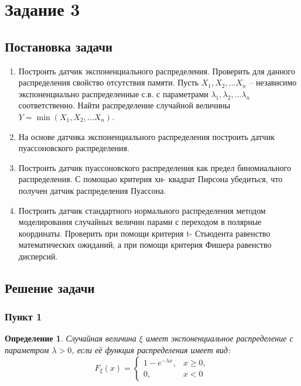 \documentclass[oneside, final, 12pt]{article}
\newtheorem{definition}{Определение}
\begin{document}
\newpage
\section{Задание 3}

\subsection{Постановка задачи}
    \begin{enumerate} 
        \item Построить датчик экспоненциального распределения. 
			Проверить для данного распределения свойство отсутствия памяти. Пусть 
        		$X_1, X_2, \ldots X_n$ -- независимо экспоненциально распределенные с.в. 
			с параметрами $\lambda_1, \lambda_2, \ldots \lambda_n$ соответственно.
			Найти распределение случайной величины $Y = \min{(X_1, X_2, \ldots X_n)}$.  
        \item На основе датчика экспоненциального распределения построить датчик
			пуассоновского распределения. 
        \item Построить датчик пуассоновского распределения как предел биномиального распределения.
			С помощью критерия хи- квадрат Пирсона убедиться, что получен датчик распределения Пуассона. 
        \item Построить датчик стандартного нормального распределения методом моделирования случайных
			величин парами с переходом в полярные координаты. Проверить при помощи
			критерия t- Стьюдента равенство математических ожиданий,
			а при помощи критерия Фишера равенство дисперсий. 
    \end{enumerate}
\subsection{Решение задачи}
\subsubsection{Пункт 1}

	\begin{definition}
		Случайная величина $\xi$ имеет экспоненциальное распределение
		с параметром $\lambda > 0$, если её функция распределения имеет вид:
		$$
			F_{\xi}(x) = \begin{cases}	
									1 - e^{-\lambda x}, & x\geqslant 0, \\
									0, & x<0
								\end{cases}
		$$
	\end{definition}
	
\end{document}
